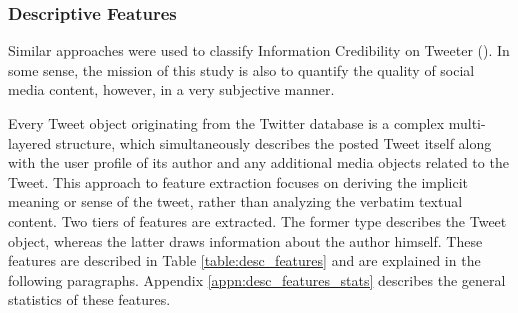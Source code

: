 	\subsubsection{Descriptive Features}
		\label{section:Descriptive_Features}
		Similar approaches were used to classify Information Credibility on Tweeter (\cite{castillo2011information}). In some sense, the mission of this study is also to quantify the quality of social media content, however, in a very subjective manner.
		\par	
		
		Every Tweet object originating from the Twitter database is a complex multi-layered structure, which  simultaneously describes the posted Tweet itself along with the user profile of its author and any additional media objects related to the Tweet. This approach to feature extraction focuses on deriving the implicit meaning or sense of the tweet, rather than analyzing the verbatim textual content. Two tiers of features are extracted. The former type describes the Tweet object, whereas the latter draws information about the author himself. These features are described in Table \ref{table:desc_features} and are explained in the following paragraphs. Appendix \ref{appn:desc_features_stats} describes the general statistics of these features. 
		
